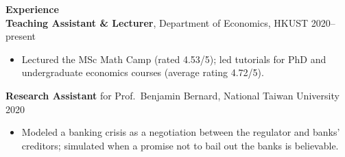 \documentclass[11pt,letterpaper]{article}
\begin{document}
{\large \textbf{Experience}}\\[-0.5pt]
\textbf{Teaching Assistant \& Lecturer}, Department of Economics, HKUST \hfill 2020--present\\
\vspace{-6pt}
\begin{itemize}
  \item Lectured the MSc Math Camp (rated 4.53/5); led tutorials for PhD and undergraduate economics courses (average rating 4.72/5).
\end{itemize}
\textbf{Research Assistant} for Prof.\ Benjamin Bernard, National Taiwan University \hfill 2020\\
\vspace{-6pt}
\begin{itemize}
  \item Modeled a banking crisis as a negotiation between the regulator and banks' creditors; simulated when a promise not to bail out the banks is believable.
\end{itemize}

\vspace{0.15pt}
\end{document}
